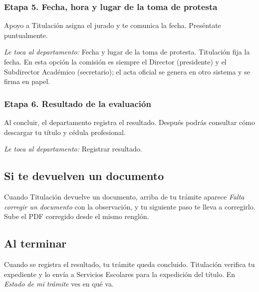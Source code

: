 \subsubsection*{Etapa 5. Fecha, hora y lugar de la toma de protesta}
Apoyo a Titulación asigna el jurado y te comunica la fecha. Preséntate puntualmente.

\emph{Le toca al departamento:} Fecha y lugar de la toma de protesta. Titulación fija la fecha. En esta opción la comisión es siempre el Director (presidente) y el Subdirector Académico (secretario); el acta oficial se genera en otro sistema y se firma en papel.
\subsubsection*{Etapa 6. Resultado de la evaluación}
Al concluir, el departamento registra el resultado. Después podrás consultar cómo descargar tu título y cédula profesional.

\emph{Le toca al departamento:} Registrar resultado. 
\subsection{Si te devuelven un documento}
Cuando Titulación devuelve un documento, arriba de tu trámite aparece \emph{Falta corregir un documento} con la observación, y tu siguiente paso te lleva a corregirlo. Sube el PDF corregido desde el mismo renglón.
\subsection{Al terminar}
Cuando se registra el resultado, tu trámite queda concluido. Titulación verifica tu expediente y lo envía a Servicios Escolares para la expedición del título. En \emph{Estado de mi trámite} ves en qué va.
